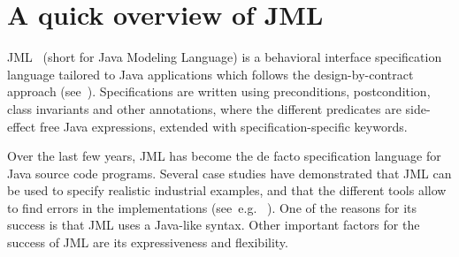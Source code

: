 


\section{A quick overview of JML} \label{BCSLprelim}
JML~\cite{JMLRefMan} (short for Java Modeling Language) is a behavioral interface specification 
language tailored to Java applications which follows the design-by-contract approach (see~\cite{M97oos}).
Specifications are written using preconditions, postcondition,
class invariants and other annotations, where the different predicates
are side-effect free Java expressions, extended with
specification-specific keywords. %

Over the last few years, JML has become the de facto specification language for
 Java source code programs. Several case studies have demonstrated that JML can be used to specify realistic
industrial examples, and that the different tools allow to find errors
in the implementations (see~e.g. \/~\cite{BreunesseCHJ04}). One
of the reasons for its success is that JML uses a Java-like
syntax.  Other important factors for the success of JML are its expressiveness and
flexibility.

